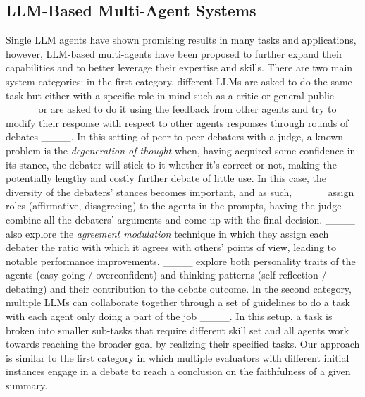 \subsection{LLM-Based Multi-Agent Systems}

Single LLM agents have shown promising results in many tasks and applications, however, LLM-based multi-agents have been proposed to further expand their capabilities and to better leverage their expertise and skills.  
There are two main system categories: in the first category, different LLMs are asked to do the same task but either with a specific role in mind such as a critic or general public ____ or are asked to do it using the feedback from other agents and try to modify their response with respect to other agents responses through rounds of debates ____. In this setting of peer-to-peer debaters with a judge, a known problem is the {\it degeneration of thought} when, having acquired some confidence in its stance, the debater will stick to it whether it's correct or not, making the potentially lengthy and costly further debate of little use. In this case, the diversity of the debaters' stances becomes important, and as such, ____ assign roles (affirmative, disagreeing) to the agents in the prompts, having the judge combine all the debaters' arguments and come up with the final decision. ____ also explore the {\it agreement modulation} technique in which they assign each debater the ratio with which it agrees with others' points of view, leading to notable performance improvements. ____ explore both personality traits of the agents (easy going / overconfident) and thinking patterns (self-reflection / debating) and their contribution to the debate outcome. In the second category, multiple LLMs can collaborate together through a set of guidelines to do a task with each agent only doing a part of the job ____. In this setup, a task is broken into smaller sub-tasks that require different skill set and all agents work towards reaching the broader goal by realizing their specified tasks. 
Our approach is similar to the first category in which multiple evaluators with different initial instances engage in a debate to reach a conclusion on the faithfulness of a given summary.
